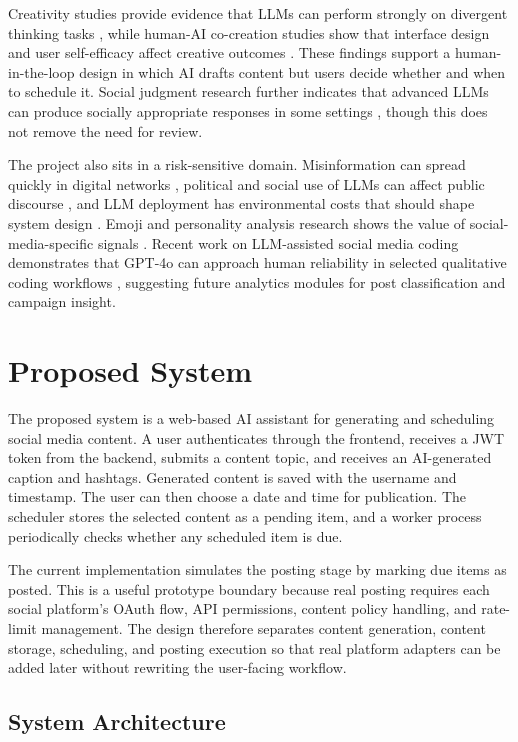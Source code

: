 \documentclass[conference]{IEEEtran}
\begin{document}
Creativity studies provide evidence that LLMs can perform strongly on divergent thinking tasks \cite{hubert2024}, while human-AI co-creation studies show that interface design and user self-efficacy affect creative outcomes \cite{mcguire2024}. These findings support a human-in-the-loop design in which AI drafts content but users decide whether and when to schedule it. Social judgment research further indicates that advanced LLMs can produce socially appropriate responses in some settings \cite{mittelstadt2024}, though this does not remove the need for review.

The project also sits in a risk-sensitive domain. Misinformation can spread quickly in digital networks \cite{govindankutty2024}, political and social use of LLMs can affect public discourse \cite{kudina2025}, and LLM deployment has environmental costs that should shape system design \cite{ren2024}. Emoji and personality analysis research shows the value of social-media-specific signals \cite{kumar2024emoji}. Recent work on LLM-assisted social media coding demonstrates that GPT-4o can approach human reliability in selected qualitative coding workflows \cite{burgess2026}, suggesting future analytics modules for post classification and campaign insight.

\section{Proposed System}

The proposed system is a web-based AI assistant for generating and scheduling social media content. A user authenticates through the frontend, receives a JWT token from the backend, submits a content topic, and receives an AI-generated caption and hashtags. Generated content is saved with the username and timestamp. The user can then choose a date and time for publication. The scheduler stores the selected content as a pending item, and a worker process periodically checks whether any scheduled item is due.

The current implementation simulates the posting stage by marking due items as posted. This is a useful prototype boundary because real posting requires each social platform's OAuth flow, API permissions, content policy handling, and rate-limit management. The design therefore separates content generation, content storage, scheduling, and posting execution so that real platform adapters can be added later without rewriting the user-facing workflow.

\subsection{System Architecture}
\end{document}

